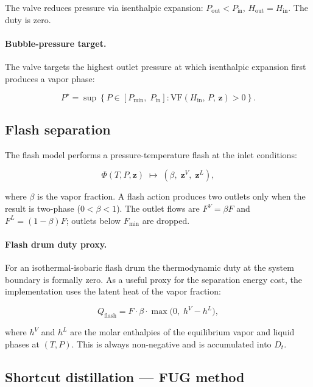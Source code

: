 \documentclass[11pt,a4paper]{article}
\theoremstyle{definition}
\theoremstyle{plain}
\begin{document}
The valve reduces pressure via isenthalpic expansion: $P_{\mathrm{out}} < P_{\mathrm{in}}$, $H_{\mathrm{out}} = H_{\mathrm{in}}$. The duty is zero.

\paragraph{Bubble-pressure target.}
The valve targets the highest outlet pressure at which isenthalpic expansion first produces a vapor phase:

\begin{equation}
 P^\star = \sup\!\left\{P \in [P_{\min},\; P_{\mathrm{in}}]
 : \mathrm{VF}(H_{\mathrm{in}},\, P,\, \bm{z}) > 0\right\}.
\end{equation}

\subsection{Flash separation}
\label{sec:flash}

The flash model performs a pressure-temperature flash at the inlet conditions:

\begin{equation}
 \Phi(T, P, \bm{z})
 \;\mapsto\;
 (\beta,\; \bm{z}^V,\; \bm{z}^L),
\end{equation}

where $\beta$ is the vapor fraction. A flash action produces two outlets only when the result is two-phase ($0 < \beta < 1$). The outlet flows are $F^V = \beta F$ and $F^L = (1-\beta)F$; outlets below $F_{\min}$ are dropped.

\paragraph{Flash drum duty proxy.}
For an isothermal-isobaric flash drum the thermodynamic duty at the system boundary is formally zero. As a useful proxy for the separation energy cost, the implementation uses the latent heat of the vapor fraction:

\begin{equation}
 Q_{\mathrm{flash}}
 = F \cdot \beta \cdot \max\!\bigl(0,\;
  h^V - h^L\bigr),
\end{equation}

where $h^V$ and $h^L$ are the molar enthalpies of the equilibrium vapor and liquid phases at $(T, P)$. This is always non-negative and is accumulated into $D_t$.

\subsection{Shortcut distillation — FUG method}
\label{sec:distillation}
\end{document}
